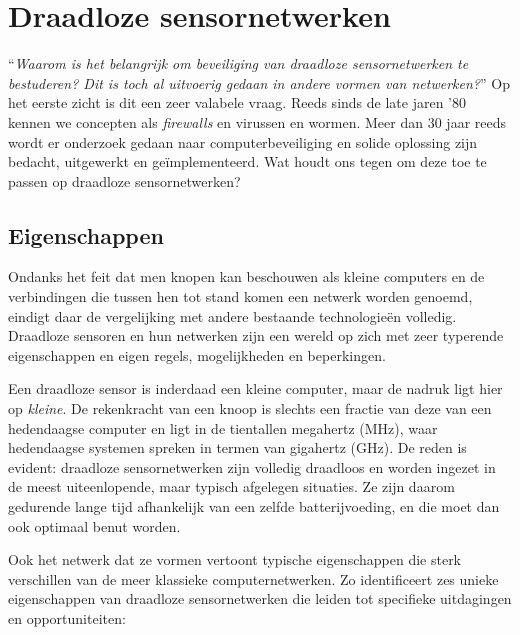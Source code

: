 
\section{Draadloze sensornetwerken}
\label{section:landscape}

``\emph{Waarom is het belangrijk om beveiliging van draadloze sensornetwerken
te bestuderen? Dit is toch al uitvoerig gedaan in andere vormen van
netwerken?}'' Op het eerste zicht is dit een zeer valabele vraag. Reeds sinds
de late jaren '80 kennen we concepten als \emph{firewalls} en virussen en
wormen. Meer dan 30 jaar reeds wordt er onderzoek gedaan naar
computerbeveiliging en solide oplossing zijn bedacht, uitgewerkt en
ge\"implementeerd. Wat houdt ons tegen om deze toe te passen op draadloze
sensornetwerken?

\subsection{Eigenschappen}

Ondanks het feit dat men knopen kan beschouwen als kleine computers en de
verbindingen die tussen hen tot stand komen een netwerk worden genoemd, eindigt
daar de vergelijking met andere bestaande technologie\"en volledig. Draadloze
sensoren en hun netwerken zijn een wereld op zich met zeer typerende
eigenschappen en eigen regels, mogelijkheden en beperkingen.

Een draadloze sensor is inderdaad een kleine computer, maar de nadruk ligt hier
op \emph{kleine}. De rekenkracht van een knoop is slechts een fractie van deze
van een hedendaagse computer en ligt in de tientallen megahertz (MHz), waar
hedendaagse systemen spreken in termen van gigahertz (GHz). De reden is
evident: draadloze sensornetwerken zijn volledig draadloos en worden ingezet in
de meest uiteenlopende, maar typisch afgelegen situaties. Ze zijn daarom
gedurende lange tijd afhankelijk van een zelfde batterijvoeding, en die moet
dan ook optimaal benut worden.

Ook het netwerk dat ze vormen vertoont typische eigenschappen die sterk
verschillen van de meer klassieke computernetwerken. Zo identificeert
\cite{blilat2012wireless} zes unieke eigenschappen van draadloze
sensornetwerken die leiden tot specifieke uitdagingen en opportuniteiten:

